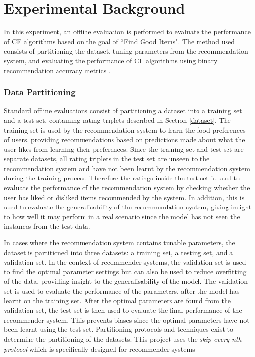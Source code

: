 \section{Experimental Background}

In this experiment, an offline evaluation is performed to evaluate the performance of CF algorithms based on the goal of ``Find Good Items". The method used consists of partitioning the dataset, tuning parameters from the recommendation system, and evaluating the performance of CF algorithms using binary recommendation accuracy metrics \cite{zhang}. 

\subsubsection{Data Partitioning} \label{partitioning}

Standard offline evaluations consist of partitioning a dataset into a training set and a test set, containing rating triplets described in Section \ref{dataset}. The training set is used by the recommendation system to learn the food preferences of users, providing recommendations based on predictions made about what the user likes from learning their preferences. Since the training set and test set are separate datasets, all rating triplets in the test set are unseen to the recommendation system and have not been learnt by the recommendation system during the training process. Therefore the ratings inside the test set is used to evaluate the performance of the recommendation system by checking whether the user has liked or disliked items recommended by the system. In addition, this is used to evaluate the generalisability of the recommendation system, giving insight to how well it may perform in a real scenario since the model has not seen the instances from the test data. 

In cases where the recommendation system contains tunable parameters, the dataset is partitioned into three datasets: a training set, a testing set, and a validation set. In the context of recommender systems, the validation set is used to find the optimal parameter settings but can also be used to reduce overfitting of the data, providing insight to the generalisability of the model. The validation set is used to evaluate the performance of the parameters, after the model has learnt on the training set. After the optimal parameters are found from the validation set, the test set is then used to evaluate the final performance of the recommender system. This prevents biases since the optimal parameters have not been learnt using the test set. Partitioning protocols and techniques exist to determine the partitioning of the datasets. This project uses the \textit{skip-every-nth protocol} which is specifically designed for recommender systems \cite{zhang}.

